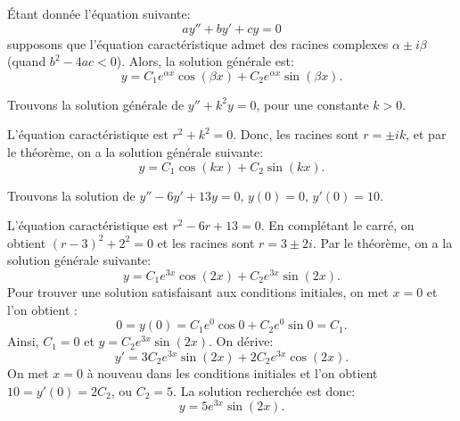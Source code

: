 \begin{theorem}
Étant donnée l'équation suivante:
\begin{equation*}
ay'' + by' + cy = 0 
\end{equation*}
supposons que l'équation caractéristique admet des racines complexes $\alpha \pm i \beta$
(quand $b^2 - 4ac < 0$).
Alors, la solution générale est: 
\begin{equation*}
y = C_1 e^{\alpha x} \cos (\beta x) + C_2 e^{\alpha x} \sin (\beta x) .
\end{equation*}
\end{theorem}

\begin{example} \label{example:sincossecondorder}
Trouvons la solution générale de $y'' + k^2 y = 0$, pour une constante 
$k > 0$.

L'équation caractéristique est  $r^2 + k^2 = 0$.  Donc, les racines sont 
$r = \pm ik$, et par le théorème, on a la solution générale  suivante:
\begin{equation*}
y = C_1 \cos (kx) + C_2 \sin (kx) .
\end{equation*}
\end{example}

\begin{example}
Trouvons la solution de  $y'' - 6 y' + 13 y = 0$, $y(0) = 0$, $y'(0) =
10$.

L'équation caractéristique est  $r^2 - 6 r + 13 = 0$. En complétant le carré, on obtient   ${(r-3)}^2 + 2^2 = 0$ et les racines sont
$r = 3 \pm 2i$.
Par le théorème, on a la solution générale suivante:
\begin{equation*}
y = C_1 e^{3x} \cos (2x) + C_2 e^{3x} \sin (2x) .
\end{equation*}
Pour trouver une solution satisfaisant aux conditions initiales, on met $x=0$ et l'on obtient :
\begin{equation*}
0 = y(0) = C_1 e^{0} \cos 0 + C_2 e^{0} \sin 0  = C_1 .
\end{equation*}
Ainsi, $C_1 = 0$ et $y = C_2 e^{3x} \sin (2x)$.  On dérive: 
\begin{equation*}
y' = 3C_2 e^{3x} \sin (2x) + 2C_2 e^{3x} \cos (2x) .
\end{equation*}
On met $x=0$ à nouveau dans les conditions initiales et l'on obtient  $10 = y'(0) = 2C_2$, ou
$C_2 = 5$.  La solution recherchée est donc:
\begin{equation*}
y = 5 e^{3x} \sin (2x) .
\end{equation*}
\end{example}

